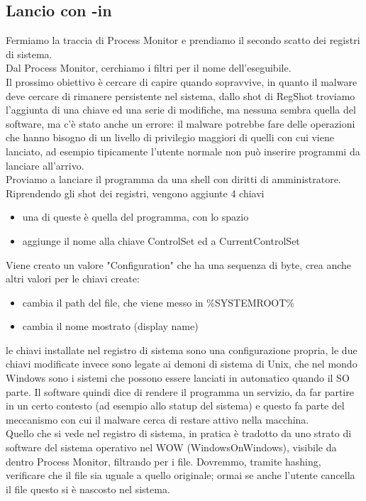 \documentclass[12pt, oneside]{extbook}
\begin{document}
\subsection{Lancio con -in}
Fermiamo la traccia di Process Monitor e prendiamo il secondo scatto dei registri di sistema.\\Dal Process Monitor, cerchiamo i filtri per il nome dell'eseguibile.\\Il prossimo obiettivo è cercare di capire quando sopravvive, in quanto il malware deve cercare di rimanere persistente nel sistema, dallo shot di RegShot troviamo l'aggiunta di una chiave ed una serie di modifiche, ma nessuna sembra quella del software, ma c'è stato anche un errore: il malware potrebbe fare delle operazioni che hanno bisogno di un livello di privilegio maggiori di quelli con cui viene lanciato, ad esempio tipicamente l'utente normale non può inserire programmi da lanciare all'arrivo.\\Proviamo a lanciare il programma da una shell con diritti di amministratore.\\Riprendendo gli shot dei registri, vengono aggiunte 4 chiavi
\begin{itemize}
\item una di queste è quella del programma, con lo spazio
\item aggiunge il nome alla chiave ControlSet ed a CurrentControlSet
\end{itemize}
Viene creato un valore "Configuration" che ha una sequenza di byte, crea anche altri valori per le chiavi create:
\begin{itemize}
\item cambia il path del file, che viene messo in \%SYSTEMROOT\%
\item cambia il nome mostrato (display name)
\end{itemize}
le chiavi installate nel registro di sistema sono una configurazione propria, le due chiavi modificate invece sono legate ai demoni di sistema di Unix, che nel mondo Windows sono i sistemi che possono essere lanciati in automatico quando il SO parte. Il software quindi dice di rendere il programma un servizio, da far partire in un certo contesto (ad esempio allo statup del sistema) e questo fa parte del meccanismo con cui il malware cerca di restare attivo nella macchina.\\Quello che si vede nel registro di sistema, in pratica è tradotto da uno strato di software del sistema operativo nel WOW (WindowsOnWindows), visibile da dentro Process Monitor, filtrando per i file. Dovremmo, tramite hashing, verificare che il file sia uguale a quello originale; ormai se anche l'utente cancella il file questo si è nascosto nel sistema.
\end{document}
